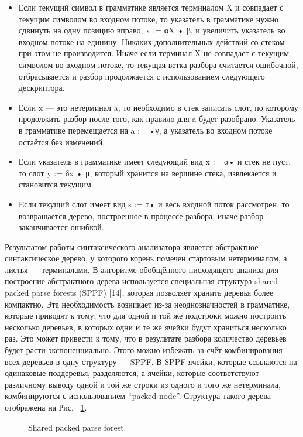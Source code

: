 \documentclass{matmex-diploma-custom}
\begin{document}
\begin{itemize}
\item Если текущий символ в грамматике является терминалом X и совпадает с текущим символом во входном потоке, то указатель в грамматике нужно сдвинуть на одну позицию вправо, x := αX • β, и увеличить указатель во входном потоке на единицу. Никаких дополнительных действий со стеком при этом не производится. Иначе если терминал X не совпадает с текущим символом во входном потоке, то текущая ветка разбора считается ошибочной, отбрасывается и разбор продолжается с использованием следующего дескриптора.
\item Если x — это нетерминал a, то необходимо в стек записать слот, по которому продолжить разбор после того, как правило для a будет разобрано. Указатель в грамматике перемещается на a := •γ, а указатель во входном потоке остаётся без изменений.
\item Если указатель в грамматике имеет следующий вид x := α• и стек не пуст, то слот y := δx • μ, который хранится на вершине стека, извлекается и становится текущим.
\item Eсли текущий слот имеет вид s := τ• и весь входной поток рассмотрен, то возвращается дерево, построенное в процессе разбора, иначе разбор заканчивается ошибкой.
\end{itemize}

Результатом работы синтаксического анализатора является абстрактное синтаксическое дерево, у которого корень помечен стартовым нетерминалом, а листья — терминалами. В алгоритме обобщённого нисходящего анализа для построение абстрактного дерева используется специальная структура shared packed parse forests (SPPF) [14], которая позволяет хранить деревья более компактно. Эта необходимость возникает из-за неоднозначностей в грамматике, которые приводят к тому, что для одной и той же подстроки можно построить несколько деревьев, в которых одни и те же ячейки будут храниться несколько раз. Это может привести к тому, что в результате разбора количество деревьев будет расти экспоненциально. Этого можно избежать за счёт комбинирования всех деревьев в одну структуру — SPPF. В SPPF ячейки, которые ссылаются на одинаковые поддеревья, разделяются, а ячейки, которые соответствуют различному выводу одной и той же строки из одного и того же нетерминала, комбинируются с использованием “packed node”. Структура такого дерева отображена на Рис. ~\ref{fig2}. 

\begin{figure}[h]
\caption{Shared packed parse forest.}
\label{fig2}
\end{figure}
\end{document}
